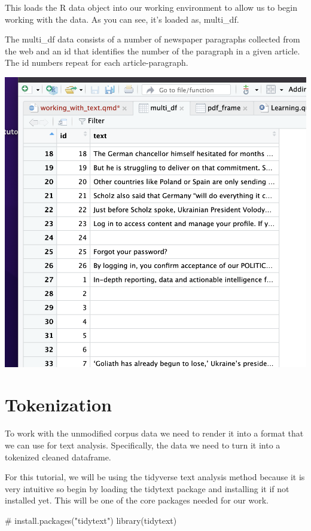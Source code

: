 \documentclass[
  letterpaper,
  DIV=11,
  numbers=noendperiod]{scrartcl}
\newenvironment{Shaded}{\begin{snugshade}}{\end{snugshade}}
\newcommand{\CommentTok}[1]{\textcolor[rgb]{0.37,0.37,0.37}{#1}}
\newcommand{\FunctionTok}[1]{\textcolor[rgb]{0.28,0.35,0.67}{#1}}
\newcommand{\NormalTok}[1]{\textcolor[rgb]{0.00,0.23,0.31}{#1}}
\begin{document}
This loads the R data object into our working environment to allow us to
begin working with the data. As you can see, it's loaded as, multi\_df.

The multi\_df data consists of a number of newspaper paragraphs
collected from the web and an id that identifies the number of the
paragraph in a given article. The id numbers repeat for each
article-paragraph.

\includegraphics{Images/7.png}

\hypertarget{tokenization}{%
\section{Tokenization}\label{tokenization}}

To work with the unmodified corpus data we need to render it into a
format that we can use for text analysis. Specifically, the data we need
to turn it into a tokenized cleaned dataframe.

For this tutorial, we will be using the tidyverse text analysis method
because it is very intuitive so begin by loading the tidytext package
and installing it if not installed yet. This will be one of the core
packages needed for our work.

\begin{Shaded}
\begin{Highlighting}[]
\CommentTok{\# install.packages("tidytext")}
\FunctionTok{library}\NormalTok{(tidytext)}
\end{Highlighting}
\end{Shaded}
\end{document}
